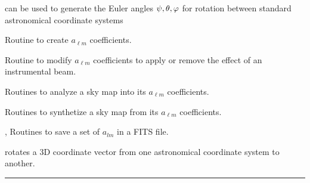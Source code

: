 \begin{related}
  \begin{sulist}{} %
  \item[\htmlref{coordsys2euler\_zyz}{sub:coordsys2euler_zyz}] can be used to generate
the Euler angles $\psi, \theta, \varphi $ for rotation between standard astronomical coordinate systems
  \item[\htmlref{create\_alm}{sub:create_alm}] Routine to create $a_{\ell m}$ coefficients.
  \item[\htmlref{alter\_alm}{sub:alter_alm}] Routine to modify $a_{\ell m}$
  coefficients to apply or remove the effect of an instrumental beam.
  \item[\htmlref{map2alm}{sub:map2alm}]  Routines to analyze a \healpix sky map into its $a_{\ell m}$
  coefficients.
  \item[\htmlref{alm2map}{sub:alm2map}] Routines to synthetize a \healpix sky map from its $a_{\ell m}$
  coefficients.
  \item[\htmlref{alms2fits}{sub:alms2fits}, \htmlref{dump\_alms}{sub:dump_alms}]
  Routines to save a set of $a_{lm}$ in a FITS file.  
  \item[\htmlref{xcc\_v\_convert}{sub:xcc_v_convert}] rotates a 3D coordinate
vector from one astronomical coordinate system to another.
  \end{sulist}
\end{related}

\rule{\hsize}{2mm}

\newpage
